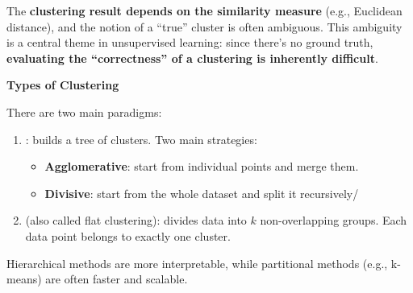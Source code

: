 \highspace
The \textbf{clustering result depends on the similarity measure} (e.g., Euclidean distance), and the notion of a ``true'' cluster is often ambiguous. This ambiguity is a central theme in unsupervised learning: since there's no ground truth, \textbf{evaluating the ``correctness'' of a clustering is inherently difficult}.

\highspace
\begin{flushleft}
    \textcolor{Green3}{ \textbf{Types of Clustering}}
\end{flushleft}
There are two main paradigms:
\begin{enumerate}
    \item {}: builds a tree of clusters. Two main strategies:
    \begin{itemize}
        \item \textbf{Agglomerative}: start from individual points and merge them.
        \item \textbf{Divisive}: start from the whole dataset and split it recursively/
    \end{itemize}

    \item {} (also called flat clustering): divides data into $k$ non-overlapping groups. Each data point belongs to exactly one cluster.
\end{enumerate}
Hierarchical methods are more interpretable, while partitional methods (e.g., k-means) are often faster and scalable.